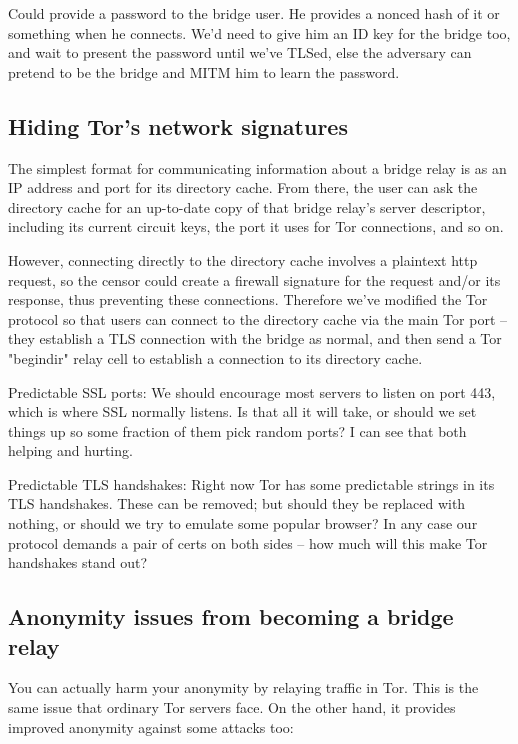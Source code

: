 \documentclass{llncs}
\begin{document}
Could provide a password to the bridge user. He provides a nonced hash of
it or something when he connects. We'd need to give him an ID key for the
bridge too, and wait to present the password until we've TLSed, else the
adversary can pretend to be the bridge and MITM him to learn the password.


\subsection{Hiding Tor's network signatures}

The simplest format for communicating information about a bridge relay
is as an IP address and port for its directory cache. From there, the
user can ask the directory cache for an up-to-date copy of that bridge
relay's server descriptor, including its current circuit keys, the port
it uses for Tor connections, and so on.

However, connecting directly to the directory cache involves a plaintext
http request, so the censor could create a firewall signature for the
request and/or its response, thus preventing these connections. Therefore
we've modified the Tor protocol so that users can connect to the directory
cache via the main Tor port -- they establish a TLS connection with
the bridge as normal, and then send a Tor "begindir" relay cell to
establish a connection to its directory cache.

Predictable SSL ports:
We should encourage most servers to listen on port 443, which is
where SSL normally listens.
Is that all it will take, or should we set things up so some fraction
of them pick random ports? I can see that both helping and hurting.

Predictable TLS handshakes:
Right now Tor has some predictable strings in its TLS handshakes.
These can be removed; but should they be replaced with nothing, or
should we try to emulate some popular browser? In any case our
protocol demands a pair of certs on both sides -- how much will this
make Tor handshakes stand out?

\subsection{Anonymity issues from becoming a bridge relay}

You can actually harm your anonymity by relaying traffic in Tor.  This is
the same issue that ordinary Tor servers face. On the other hand, it
provides improved anonymity against some attacks too:
\end{document}
